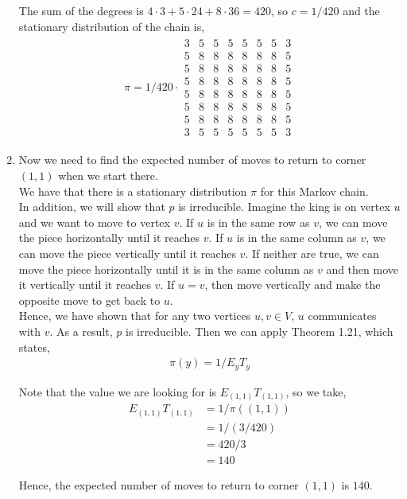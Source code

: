 \documentclass[12pt]{article}
\begin{document}
\begin{enumerate}[label=(\alph*)]
The sum of the degrees is $4 \cdot 3 + 5 \cdot 24 + 8 \cdot 36 = 420$, so $c = 1/420$ and the stationary distribution of the chain is,
\begin{align*}
\pi = 1/420 \cdot \begin{array}{cccc|cccc}
  3 & 5 & 5 & 5 & 5 & 5 & 5 & 3\\
  5 & 8 & 8 & 8 & 8 & 8 & 8 & 5\\
  5 & 8 & 8 & 8 & 8 & 8 & 8 & 5\\
  5 & 8 & 8 & 8 & 8 & 8 & 8 & 5\\
  \hline
  5 & 8 & 8 & 8 & 8 & 8 & 8 & 5\\
  5 & 8 & 8 & 8 & 8 & 8 & 8 & 5\\
  5 & 8 & 8 & 8 & 8 & 8 & 8 & 5\\
  3 & 5 & 5 & 5 & 5 & 5 & 5 & 3
\end{array}
\end{align*}

\item Now we need to find the expected number of moves to return to corner $(1,1)$ when we start there.\\

We have that there is a stationary distribution $\pi$ for this Markov chain.\\

In addition, we will show that $p$ is irreducible. Imagine the king is on vertex $u$ and we want to move to vertex $v$. If $u$ is in the same row as $v$, we can move the piece horizontally until it reaches $v$. If $u$ is in the same column as $v$, we can move the piece vertically until it reaches $v$. If neither are true, we can move the piece horizontally until it is in the same column as $v$ and then move it vertically until it reaches $v$. If $u = v$, then move vertically and make the opposite move to get back to $u$.\\

Hence, we have shown that for any two vertices $u, v \in V$, $u$ communicates with $v$. As a result, $p$ is irreducible. Then we can apply Theorem 1.21, which states,
\begin{align*}
\pi(y) = 1/E_yT_y
\end{align*}

Note that the value we are looking for is $E_{(1,1)}T_{(1,1)}$, so we take,
\begin{align*}
E_{(1,1)}T_{(1,1)} &= 1/\pi((1,1))\\
&= 1/(3/420)\\
&= 420/3\\
&= 140
\end{align*}

Hence, the expected number of moves to return to corner $(1, 1)$ is $140$.

\end{enumerate}
\end{document}
